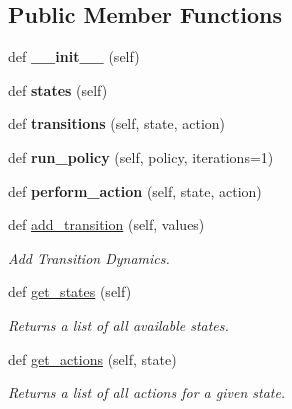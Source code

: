 \subsection*{Public Member Functions}
\begin{DoxyCompactItemize}
\item 
\mbox{\label{classsrc_1_1worlds_1_1abstract__world_1_1_abstract_world_a8bdd47c57f049a3e396ea64f4659db77}} 
def {\bfseries \+\_\+\+\_\+init\+\_\+\+\_\+} (self)
\item 
\mbox{\label{classsrc_1_1worlds_1_1abstract__world_1_1_abstract_world_a9da9b2c6a2403e83b08ba43d53a43d7d}} 
def {\bfseries states} (self)
\item 
\mbox{\label{classsrc_1_1worlds_1_1abstract__world_1_1_abstract_world_adbb238f1675445eab7c0b002f9860aec}} 
def {\bfseries transitions} (self, state, action)
\item 
\mbox{\label{classsrc_1_1worlds_1_1abstract__world_1_1_abstract_world_a79b8c2b7f122d0d2463736248417dcec}} 
def {\bfseries run\+\_\+policy} (self, policy, iterations=1)
\item 
\mbox{\label{classsrc_1_1worlds_1_1abstract__world_1_1_abstract_world_a3ef3e0539760634d7edfb132ee994cbb}} 
def {\bfseries perform\+\_\+action} (self, state, action)
\item 
def \hyperlink{classsrc_1_1worlds_1_1abstract__world_1_1_abstract_world_a0cafa6f47ff6a2c0afe7156e40e893fe}{add\+\_\+transition} (self, values)
\begin{DoxyCompactList}\small\item\em Add Transition Dynamics. \end{DoxyCompactList}\item 
\mbox{\label{classsrc_1_1worlds_1_1abstract__world_1_1_abstract_world_a1c5c774e258d31c703dc7a95280a686d}} 
def \hyperlink{classsrc_1_1worlds_1_1abstract__world_1_1_abstract_world_a1c5c774e258d31c703dc7a95280a686d}{get\+\_\+states} (self)
\begin{DoxyCompactList}\small\item\em Returns a list of all available states. \end{DoxyCompactList}\item 
def \hyperlink{classsrc_1_1worlds_1_1abstract__world_1_1_abstract_world_a177196a17a32460d8076eaffa643646b}{get\+\_\+actions} (self, state)
\begin{DoxyCompactList}\small\item\em Returns a list of all actions for a given state. \end{DoxyCompactList}\end{DoxyCompactItemize}


